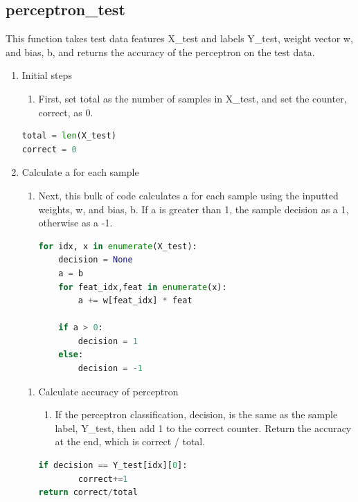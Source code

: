 \documentclass[11pt]{article}
\theoremstyle{definition}
\begin{document}
\subsection{perceptron\_test}
This function takes test data features \textsf{X\_test} and labels \textsf{Y\_test}, weight vector \textsf{w}, and bias, \textsf{b}, and returns the accuracy of the perceptron on the test data.
\begin{enumerate}
    \item Initial steps
    \begin{enumerate}
        \item First, set \textsf{total} as the number of samples in \textsf{X\_test}, and set the counter, \textsf{correct}, as 0.
    \end{enumerate}
\begin{lstlisting}[language=python, frame=single]
total = len(X_test)
correct = 0
\end{lstlisting}
    \item Calculate \textsf{a} for each sample
    \begin{enumerate}
        \item Next, this bulk of code calculates \textsf{a} for each sample using the inputted weights, \textsf{w}, and bias, \textsf{b}. If \textsf{a} is greater than 1, the sample \textsf{decision} as a 1, otherwise as a -1.
\begin{lstlisting}[language=python, frame=single]
for idx, x in enumerate(X_test):
    decision = None
    a = b
    for feat_idx,feat in enumerate(x):
    	a += w[feat_idx] * feat

    if a > 0:
    	decision = 1
    else:
    	decision = -1
\end{lstlisting}
    \end{enumerate}
\begin{enumerate}
    \item Calculate accuracy of perceptron
    \begin{enumerate}
        \item If the perceptron classification, \textsf{decision}, is the same as the sample label, \textsf{Y\_test}, then add 1 to the \textsf{correct} counter. Return the accuracy at the end, which is \textsf{correct / total}.
    \end{enumerate}
\begin{lstlisting}[language=python, frame=single]
	if decision == Y_test[idx][0]:
		correct+=1
return correct/total
\end{lstlisting}
\end{enumerate}
\end{enumerate}
\end{document}
